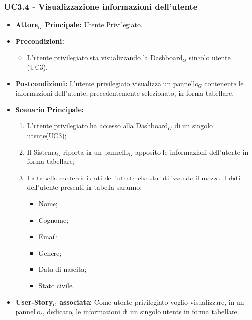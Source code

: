 \documentclass[10pt]{article}
\begin{document}
\begin{justify}
\subsubsection{\textbf{UC3.4 - Visualizzazione informazioni dell'utente}}
\label{UC3.4}
\begin{itemize}
     \item \textbf{Attore$_G$ Principale:} Utente Privilegiato.
     \item \textbf{Precondizioni:}
        \begin{itemize}
    		\item L'utente privilegiato sta visualizzando la Dashboard$_G$ singolo utente (UC3).
        \end{itemize}
      \item \textbf{Postcondizioni:} L'utente privilegiato visualizza un pannello$_G$ contenente le informazioni dell'utente, precedentemente selezionato, in forma tabellare. 
      \item \textbf{Scenario Principale:}
        \begin{enumerate}
            \item L'utente privilegiato ha accesso alla Dashboard$_G$ di un singolo utente(UC3);
            \item Il Sistema$_G$ riporta  in un pannello$_G$ apposito le informazioni dell'utente in forma tabellare;
            \item La tabella conterrà i dati dell'utente che sta utilizzando il mezzo. I dati dell'utente presenti in tabella saranno:
              \begin{itemize}
              \item Nome;
              \item Cognome;
              \item Email;
              \item Genere;
              \item Data di nascita;
              \item Stato civile.
              \end{itemize}
        \end{enumerate}
     \item \textbf{User-Story$_G$ associata:}
       Come utente privilegiato voglio visualizzare, in un pannello$_G$ dedicato, le informazioni di un singolo utente in forma tabellare.
\end{itemize}


\end{justify}
\end{document}
